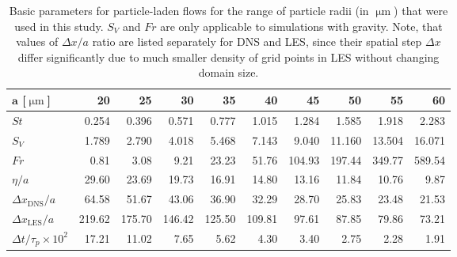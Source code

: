 \begin{table}
\centering
\small
\begin{tabular}{lrrrrrrrrr}
$\mathbf{a}$ [$\upmu\text{m}$] & 20 & 25 & 30 & 35 & 40 & 45 & 50 & 55 & 60  \\ \hline
$St$ & 0.254 & 0.396 & 0.571 & 0.777 & 1.015 & 1.284 & 1.585 & 1.918 & 2.283 \\
$S_V$ & 1.789 & 2.790 & 4.018 & 5.468 & 7.143 & 9.040 & 11.160 & 13.504 & 16.071 \\
$Fr$ & 0.81 & 3.08 & 9.21 & 23.23 & 51.76 & 104.93 & 197.44 & 349.77 & 589.54 \\
$\eta / a$ & 29.60 & 23.69 & 19.73 & 16.91 & 14.80 & 13.16 & 11.84 & 10.76 & 9.87 \\
$\Delta x_{\text{DNS}} / a$ & 64.58 & 51.67 & 43.06 & 36.90 & 32.29 & 28.70 & 25.83 & 23.48 & 21.53 \\
$\Delta x_{\text{LES}} / a$ & 219.62 & 175.70 & 146.42 & 125.50 & 109.81 & 97.61 & 87.85 & 79.86 & 73.21 \\
$\Delta t / \tau_p \times 10^2$ & 17.21 & 11.02 & 7.65 & 5.62 & 4.30 & 3.40 & 2.75 & 2.28 & 1.91 \\ \hline
\end{tabular}
\caption{Basic parameters for particle-laden flows for the range of particle radii (in $\upmu\text{m}$) that were used in this study.
$S_V$ and $Fr$ are only applicable to simulations with gravity.
Note, that values of $\Delta x / a$ ratio are listed separately for DNS and LES, since their spatial step $\Delta x$ differ significantly due to much smaller density of grid points in LES without changing domain size. }
\label{tab:part-stats}
\end{table}